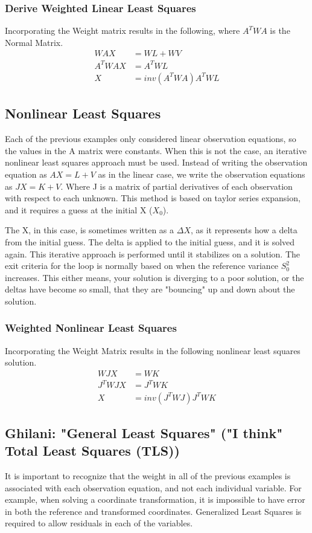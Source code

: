 \subsubsection*{Derive Weighted Linear Least Squares}
Incorporating the Weight matrix results in the following, where $A^TWA$ is the Normal Matrix.
\begin{align*}
WAX &= WL + WV \\
A^TWAX &= A^TWL \\
X &= inv(A^TWA)A^TWL
\end{align*}

\subsection{Nonlinear Least Squares}
Each of the previous examples only considered linear observation equations, so the values in the A matrix were constants.  When this is not the case, an iterative nonlinear least squares approach must be used.  Instead of writing the observation equation as $AX=L+V$ as in the linear case, we write the observation equations as $JX=K+V$. Where J is a matrix of partial derivatives of each observation with respect to each unknown.  This method is based on taylor series expansion, and it requires a guess at the initial X ($X_0$).  

The X, in this case, is sometimes written as a $\Delta X$, as it represents how a delta from the initial guess.  The delta is applied to the initial guess, and it is solved again.  This iterative approach is performed until it stabilizes on a solution.  The exit criteria for the loop is normally based on when the reference variance $S_0^2$ increases.  This either means, your solution is diverging to a poor solution, or the deltas have become so small, that they are "bouncing" up and down about the solution.

\subsubsection*{Weighted Nonlinear Least Squares}
Incorporating the Weight Matrix results in the following nonlinear least squares solution.
\begin{align*}
WJX &= WK \\
J^TWJX &= J^TWK \\
X &= inv(J^TWJ)J^TWK
\end{align*}
\subsection{Ghilani: "General Least Squares" ("I think" Total Least Squares (TLS))}
It is important to recognize that the weight in all of the previous examples is associated with each observation equation, and not each individual variable.  For example, when solving a coordinate transformation, it is impossible to have error in both the reference and transformed coordinates. Generalized Least Squares is required to allow residuals in each of the variables.

